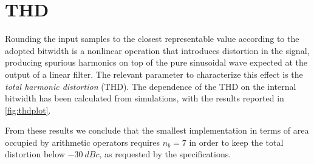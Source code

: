 \section{THD}
\label{sec:THD}
Rounding the input samples to the closest representable value according to the adopted bitwidth is a nonlinear operation that introduces distortion in the signal, producing spurious harmonics on top of the pure sinusoidal wave expected at the output of a linear filter. The relevant parameter to characterize this effect is the \textit{total harmonic distortion} (THD). The dependence of the THD on the internal bitwidth has been calculated from simulations, with the results reported in \autoref{fig:thdplot}.


From these results we conclude that the smallest implementation in terms of area occupied by arithmetic operators requires $n_b=7$ in order to keep the total distortion below $\SI{-30}{dBc}$, as requested by the specifications.
